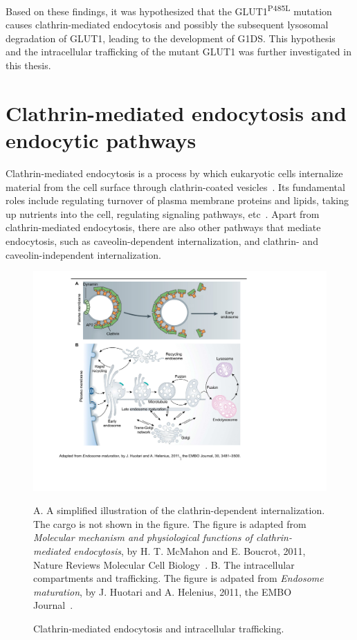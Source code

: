 Based on these findings, it was hypothesized that the GLUT1\textsuperscript{P485L} mutation causes clathrin-mediated endocytosis and possibly the subsequent lysosomal degradation of GLUT1, leading to the development of G1DS. This hypothesis and the intracellular trafficking of the mutant GLUT1 was further investigated in this thesis.

\section{Clathrin-mediated endocytosis and endocytic pathways}
Clathrin-mediated endocytosis is a process by which eukaryotic cells internalize material from the cell surface through clathrin-coated vesicles~\cite{McMahon}. Its fundamental roles include regulating turnover of plasma membrane proteins and lipids, taking up nutrients into the cell, regulating signaling pathways, etc~\cite{McMahon,Humphries}. Apart from clathrin-mediated endocytosis, there are also other pathways that mediate endocytosis, such as caveolin-dependent internalization, and clathrin- and caveolin-independent internalization.
\begin{figure}[h]
\centering
\includegraphics[scale=0.7]{Figures/endocytosis}
\caption{Clathrin-mediated endocytosis and intracellular trafficking.}
\vspace*{-3mm}
\small \justify
A. A simplified illustration of the clathrin-dependent internalization. The cargo is not shown in the figure. The figure is adapted from \textit{Molecular mechanism and physiological functions of clathrin-mediated endocytosis}, by H. T. McMahon and E. Boucrot, 2011, Nature Reviews Molecular Cell Biology~\cite{McMahon}. B. The intracellular compartments and trafficking. The figure is adpated from \textit{Endosome maturation}, by J. Huotari and A. Helenius, 2011, the EMBO Journal~\cite{Huotari}. 
\label{fig:endocytosis}
\end{figure}

